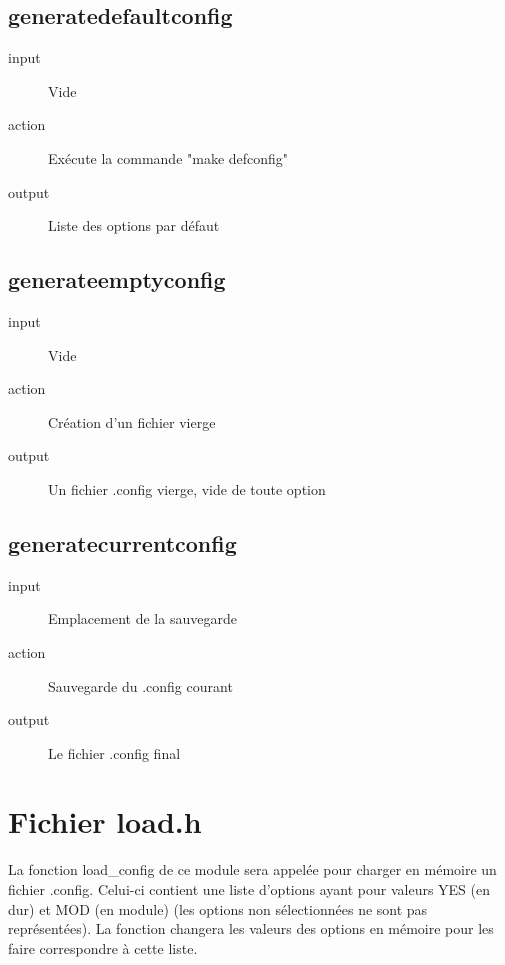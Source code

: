\documentclass[16pts]{report}
\begin{document}
\section{generate\textunderscore default\textunderscore config}
\label{sec:generate default config}
\begin{description}
    \item[input] Vide
    \item[action] Exécute la commande "make defconfig"
    \item[output] Liste des options par défaut
\end{description}

\section{generate\textunderscore empty\textunderscore config}
\label{sec:generate empty config}
\begin{description}
    \item[input] Vide
    \item[action] Création d'un fichier vierge
    \item[output] Un fichier .config vierge, vide de toute option
\end{description}

\section{generate\textunderscore current\textunderscore config}
\label{sec:generate current config}
\begin{description}
    \item[input] Emplacement de la sauvegarde
    \item[action] Sauvegarde du .config courant
    \item[output] Le fichier .config final
\end{description}

\chapter{Fichier load.h}
\label{cha:Fichier load.h}
La fonction load\_config de ce module sera appelée pour charger en mémoire un
fichier .config. Celui-ci contient une liste d’options ayant pour valeurs YES
(en dur) et MOD (en module) (les options non sélectionnées ne sont pas
représentées). La fonction changera les valeurs des options en mémoire pour les
faire correspondre à cette liste.
\end{document}

